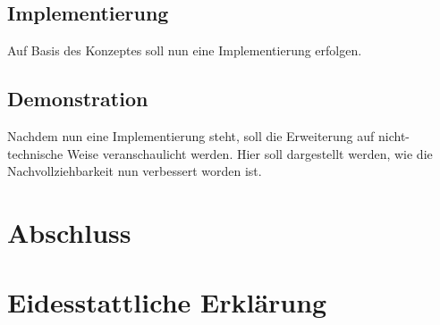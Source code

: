 \documentclass[oneside, ngerman, final, 11pt, a4paper, 1.1headlines, headinclude=false, footinclude=false, mpinclude=false, pagesize, onecolumn, titlepage, parskip=half, headsepline, chapterprefix=false, version=first, listof=totoc, bibliography=totoc, toc=graduated, fleqn, twoside=true]{scrbook}
\begin{document}
		\section{Implementierung}
		
		Auf Basis des Konzeptes soll nun eine Implementierung erfolgen.
	
		\section{Demonstration}
		
		Nachdem nun eine Implementierung steht, soll die Erweiterung auf nicht-technische Weise veranschaulicht werden. Hier soll dargestellt werden, wie die Nachvollziehbarkeit nun verbessert worden ist.
	
	\chapter{Abschluss}
	
	
%	
	
	\chapter{Eidesstattliche Erklärung}
	
	
	
	\settowidth{\nomlabelwidth}{API}
	\printnomenclature{}
	
	\newpage{}
	
	
	\listoffigures
	
	\newpage{}
	
	
	\listoftables
	
	\lstlistoflistings
	
	\newpage{}
	
	
	
\end{document}

